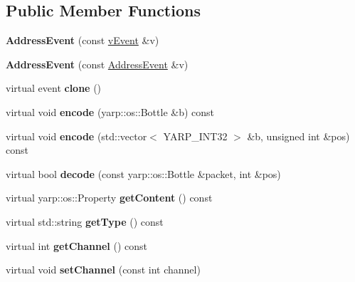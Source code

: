 \subsection*{Public Member Functions}
\begin{DoxyCompactItemize}
\item 
{\bfseries Address\+Event} (const \hyperlink{classev_1_1vEvent}{v\+Event} \&v)\hypertarget{classev_1_1AddressEvent_a62e810ce50e155828957e61c99a165d2}{}\label{classev_1_1AddressEvent_a62e810ce50e155828957e61c99a165d2}

\item 
{\bfseries Address\+Event} (const \hyperlink{classev_1_1AddressEvent}{Address\+Event} \&v)\hypertarget{classev_1_1AddressEvent_a5072b43ca93fdcdf0294ecff78f3b424}{}\label{classev_1_1AddressEvent_a5072b43ca93fdcdf0294ecff78f3b424}

\item 
virtual event {\bfseries clone} ()\hypertarget{classev_1_1AddressEvent_adabe75246de88f722d65b4994c7955eb}{}\label{classev_1_1AddressEvent_adabe75246de88f722d65b4994c7955eb}

\item 
virtual void {\bfseries encode} (yarp\+::os\+::\+Bottle \&b) const \hypertarget{classev_1_1AddressEvent_a38b726cef241624c31312a3eb1f46730}{}\label{classev_1_1AddressEvent_a38b726cef241624c31312a3eb1f46730}

\item 
virtual void {\bfseries encode} (std\+::vector$<$ Y\+A\+R\+P\+\_\+\+I\+N\+T32 $>$ \&b, unsigned int \&pos) const \hypertarget{classev_1_1AddressEvent_a4438f02305adb8b8230f9fdbc6b7394b}{}\label{classev_1_1AddressEvent_a4438f02305adb8b8230f9fdbc6b7394b}

\item 
virtual bool {\bfseries decode} (const yarp\+::os\+::\+Bottle \&packet, int \&pos)\hypertarget{classev_1_1AddressEvent_a91d805c2aeb136bb23e4da04e29d98b1}{}\label{classev_1_1AddressEvent_a91d805c2aeb136bb23e4da04e29d98b1}

\item 
virtual yarp\+::os\+::\+Property {\bfseries get\+Content} () const \hypertarget{classev_1_1AddressEvent_ad235efba4a6bd3fc79b853ecefad88c9}{}\label{classev_1_1AddressEvent_ad235efba4a6bd3fc79b853ecefad88c9}

\item 
virtual std\+::string {\bfseries get\+Type} () const \hypertarget{classev_1_1AddressEvent_aef0dd1b9a82c2745ccaa0cfc9105df55}{}\label{classev_1_1AddressEvent_aef0dd1b9a82c2745ccaa0cfc9105df55}

\item 
virtual int {\bfseries get\+Channel} () const \hypertarget{classev_1_1AddressEvent_a88038634ab480b42ac1f056abe004b5d}{}\label{classev_1_1AddressEvent_a88038634ab480b42ac1f056abe004b5d}

\item 
virtual void {\bfseries set\+Channel} (const int channel)\hypertarget{classev_1_1AddressEvent_a50e188b1c5702cab67a2175b81c32767}{}\label{classev_1_1AddressEvent_a50e188b1c5702cab67a2175b81c32767}

\end{DoxyCompactItemize}
